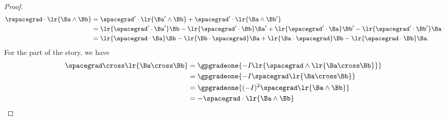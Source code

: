 \begin{proof}
\begin{equation}\label{eqn:vectorcalc:860}
\begin{aligned}
\rspacegrad \cdot \lr{ \Ba \wedge \Bb }
&=
\spacegrad' \cdot \lr{ \Ba' \wedge \Bb }
+ \spacegrad' \cdot \lr{ \Ba \wedge \Bb' } \\
&=
\lr{ \spacegrad' \cdot \Ba' } \Bb
- \lr{ \spacegrad' \cdot \Bb } \Ba'
+ \lr{ \spacegrad' \cdot \Ba } \Bb'
- \lr{ \spacegrad' \cdot \Bb' } \Ba
\\
&=
\lr{ \spacegrad \cdot \Ba } \Bb
- \lr{ \Bb \cdot \spacegrad } \Ba
+ \lr{ \Ba \cdot \spacegrad } \Bb
- \lr{ \spacegrad \cdot \Bb } \Ba.
\end{aligned}
\end{equation}
For the  part of the story, we have
\begin{equation}\label{eqn:vectorcalc:870}
\begin{aligned}
\spacegrad \cross \lr{ \Ba \cross \Bb }
&=
\gpgradeone{
-I \lr{ \spacegrad \wedge \lr{ \Ba \cross \Bb } }
} \\
&=
\gpgradeone{
-I \spacegrad \lr{ \Ba \cross \Bb }
} \\
&=
\gpgradeone{
(-I)^2 \spacegrad \lr{ \Ba \wedge \Bb }
} \\
&=
-
\spacegrad \cdot \lr{ \Ba \wedge \Bb }
\end{aligned}
\end{equation}
\end{proof}

